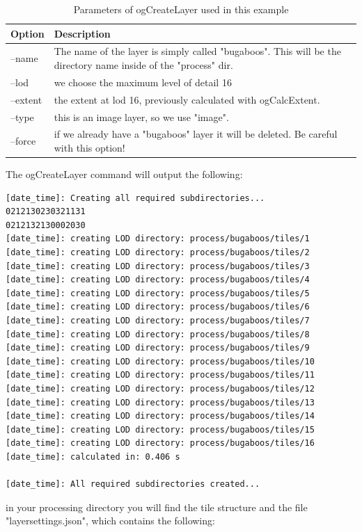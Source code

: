 \documentclass[
	12pt,
	a4paper,
	english,	
	appendixprefix,				     			        
	openany,		     	
	abstracton,		    		    
 	BCOR8mm,		    
]{scrartcl}
\begin{document}
\begin{table}[H]
\centering
\begin{tabular}{|l|p{6cm}|}
\hline
\textbf{Option}	& \textbf{Description}\\
\hline
--name	& The name of the layer is simply called "bugaboos". This will be the directory name inside of the "process" dir.\\
\hline
--lod   & we choose the maximum level of detail 16\\
\hline
--extent & the extent at lod 16, previously calculated with ogCalcExtent.\\
\hline
--type & this is an image layer, so we use "image".\\
\hline
--force & if we already have a "bugaboos" layer it will be deleted. Be careful with this option!\\
\hline
\end{tabular}
\caption{Parameters of ogCreateLayer used in this example}
\end{table}

The ogCreateLayer command will output the following:


\begin{lstlisting}
[date_time]: Creating all required subdirectories...
0212130230321131
0212132130002030
[date_time]: creating LOD directory: process/bugaboos/tiles/1
[date_time]: creating LOD directory: process/bugaboos/tiles/2
[date_time]: creating LOD directory: process/bugaboos/tiles/3
[date_time]: creating LOD directory: process/bugaboos/tiles/4
[date_time]: creating LOD directory: process/bugaboos/tiles/5
[date_time]: creating LOD directory: process/bugaboos/tiles/6
[date_time]: creating LOD directory: process/bugaboos/tiles/7
[date_time]: creating LOD directory: process/bugaboos/tiles/8
[date_time]: creating LOD directory: process/bugaboos/tiles/9
[date_time]: creating LOD directory: process/bugaboos/tiles/10
[date_time]: creating LOD directory: process/bugaboos/tiles/11
[date_time]: creating LOD directory: process/bugaboos/tiles/12
[date_time]: creating LOD directory: process/bugaboos/tiles/13
[date_time]: creating LOD directory: process/bugaboos/tiles/14
[date_time]: creating LOD directory: process/bugaboos/tiles/15
[date_time]: creating LOD directory: process/bugaboos/tiles/16
[date_time]: calculated in: 0.406 s

[date_time]: All required subdirectories created...
\end{lstlisting}


in your processing directory you will find the tile structure and the file "layersettings.json", which contains the following:
\end{document}
